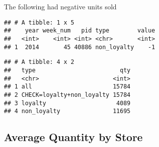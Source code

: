 \documentclass[]{article}
\newenvironment{Shaded}{\begin{snugshade}}{\end{snugshade}}
\newcommand{\KeywordTok}[1]{\textcolor[rgb]{0.13,0.29,0.53}{\textbf{#1}}}
\newcommand{\DataTypeTok}[1]{\textcolor[rgb]{0.13,0.29,0.53}{#1}}
\newcommand{\DecValTok}[1]{\textcolor[rgb]{0.00,0.00,0.81}{#1}}
\newcommand{\StringTok}[1]{\textcolor[rgb]{0.31,0.60,0.02}{#1}}
\newcommand{\OperatorTok}[1]{\textcolor[rgb]{0.81,0.36,0.00}{\textbf{#1}}}
\newcommand{\NormalTok}[1]{#1}
\begin{document}
The following had negative units sold

\begin{Shaded}
\end{Shaded}

\begin{verbatim}
## # A tibble: 1 x 5
##    year week_num   pid type        value
##   <int>    <int> <int> <chr>       <int>
## 1  2014       45 40886 non_loyalty    -1
\end{verbatim}

\begin{Shaded}
\end{Shaded}

\begin{verbatim}
## # A tibble: 4 x 2
##   type                        qty
##   <chr>                     <int>
## 1 all                       15784
## 2 CHECK=loyalty+non_loyalty 15784
## 3 loyalty                    4089
## 4 non_loyalty               11695
\end{verbatim}

\subsection{Average Quantity by Store}\label{average-quantity-by-store}
\end{document}
